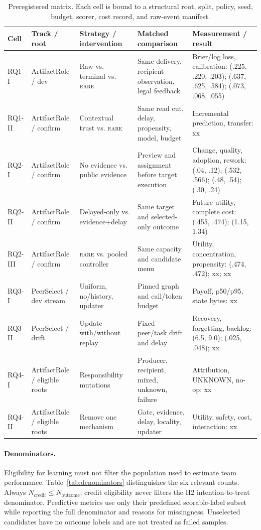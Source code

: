 \documentclass[sigconf,anonymous]{aamas}
\newcommand{\rare}{\textsc{rare}}
\begin{document}
\begin{table}[t]
\centering\fontsize{7.5}{8.6}\selectfont
\setlength{\tabcolsep}{2.1pt}
\begin{tabular}{p{}p{}p{}p{}p{}}
\toprule
Cell & Track / root & Strategy / intervention & Matched comparison & Measurement / result \\
\midrule
RQ1-I & ArtifactRole / dev & Raw vs. terminal vs. \rare{} & Same delivery, recipient observation, legal feedback & Brier/log loss, calibration: (.225, .220, .203); (.637, .625, .584); (.073, .068, .055) \\
RQ1-II & ArtifactRole / confirm & Contextual trust vs. \rare{} & Same read cut, delay, propensity, model, budget & Incremental prediction, transfer: xx \\
RQ2-I & ArtifactRole / confirm & No evidence vs. public evidence & Preview and assignment before target execution & Change, quality, adoption, rework: (.04, .12); (.532, .566); (.48, .54); (.30, .24) \\
RQ2-II & ArtifactRole / confirm & Delayed-only vs. evidence+delay & Same target and selected-only outcome & Future utility, complete cost: (.455, .474); (1.15, 1.34) \\
RQ2-III & ArtifactRole / confirm & \rare{} vs. pooled controller & Same capacity and candidate menu & Utility, concentration, propensity: (.474, .472); xx; xx \\
RQ3-I & PeerSelect / dev stream & Uniform, no/history, updater & Pinned graph and call/token budget & Payoff, p50/p95, state bytes: xx \\
RQ3-II & PeerSelect / drift & Update with/without replay & Fixed peer/task drift and delay & Recovery, forgetting, backlog: (6.5, 9.0); (.025, .048); xx \\
RQ4-I & ArtifactRole / eligible roots & Responsibility mutations & Producer, recipient, mixed, unknown, failure & Attribution, UNKNOWN, no-op: xx \\
RQ4-II & ArtifactRole / eligible roots & Remove one mechanism & Gate, evidence, delay, locality, updater & Utility, safety, cost, interaction: xx \\
\bottomrule
\end{tabular}
\caption{Preregistered matrix. Each cell is bound to a structural root, split, policy, seed, budget, scorer, cost record, and raw-event manifest.}
\label{tab:matrix}
\end{table}

\paragraph{Denominators.} Eligibility for learning must not filter the population used to estimate team performance. Table~\ref{tab:denominators} distinguishes the six relevant counts. Always $N_{\mathrm{credit}}\leq N_{\mathrm{outcome}}$; credit eligibility never filters the H2 intention-to-treat denominator. Predictive metrics use only their predefined scorable-label subset while reporting the full denominator and reasons for missingness. Unselected candidates have no outcome labels and are not treated as failed samples.
\end{document}
